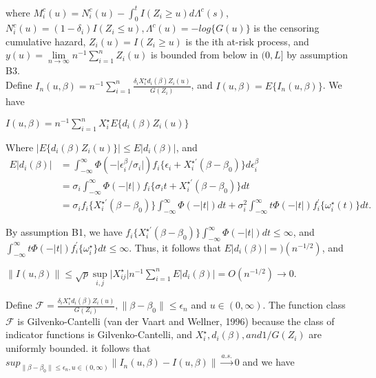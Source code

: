 \documentclass[12pt]{article}
\begin{document}
	\noindent where $M_i^c(u) = N_i^c(u)-\int_{0}^{t}I(Z_i\geq u)d\Lambda^c(s)$, $N_i^c(u)=(1-\delta_i)I(Z_i\leq u), \Lambda^c(u) = -log\{G(u)\}$ is the censoring cumulative hazard, $Z_i(u)=I(Z_i \geq u)$ is the ith at-risk process, and $y(u)=\lim\limits_{n \to \infty} n^{-1} \sum_{i=1}^{n} Z_i(u)$ is bounded from below in $(0,L]$ by assumption B3.\\
	
	\noindent Define $I_n(u,\beta)=n^{-1} \sum_{i=1}^{n}\frac{\delta_i X_i^\star d_i(\beta)Z_i(u)}{G(Z_i)}$, and $I(u,\beta)=E\{I_n(u,\beta)\}$. We have
	\begin{center}
		$I(u,\beta)=n^{-1} \sum_{i=1}^{n}X_i^\star E\{d_i(\beta)Z_i(u)\}$
	\end{center}
	Where $\lvert E\{d_i(\beta)Z_i(u)\} \rvert \leq E\lvert d_i(\beta) \rvert$, and
	\begin{align*}
	E\lvert d_i(\beta) \rvert & = \int_{-\infty}^{\infty} \Phi(-\lvert\epsilon_i^\beta/\sigma_i\rvert)f_i\{\epsilon_i+X_i^{\star \prime}(\beta-\beta_0)\}d\epsilon_i^\beta\\
	& = \sigma_i \int_{-\infty}^{\infty} \Phi(-\lvert t \rvert)f_i\{\sigma_i t+X_i^{\star \prime}(\beta-\beta_0)\}dt\\
	& = \sigma_i f_i\{X_i^{\star \prime}(\beta-\beta_0)\}\int_{-\infty}^{\infty} \Phi (- \lvert t \rvert)dt + \sigma_i^2 \int_{-\infty}^{\infty}t \Phi (- \lvert t \rvert) f_i^\prime \{\omega_i^\star(t) \}dt.
	\end{align*}
	
	\noindent By assumption B1, we have $f_i\{X_i^{\star \prime}(\beta-\beta_0) \}\int_{-\infty}^{\infty}\Phi(- \lvert t \rvert)dt \leq \infty$, and \mbox{$\int_{-\infty}^{\infty} t \Phi(- \lvert t \rvert)f_i^\prime\{\omega_i^{\star} \}dt\leq \infty$}. Thus, it follows that $E\lvert d_i(\beta) \rvert=)(n^{-1/2})$, and
	
	\begin{center}
		$\lVert I(u,\beta) \rVert \leq \sqrt{p} \sup\limits_{i,j} \lvert X_{ij}^{\star} \rvert n^{-1}\sum_{i=1}^{n} E \lvert d_i(\beta) \rvert = O(n^{-1/2}) \to 0$.
	\end{center}
	
	\noindent Define $\mathcal{F}=\frac{\delta_i X_i^\star d_i(\beta) Z_i(u)}{G(Z_i)}, \lVert \beta - \beta_0 \rVert \leq \epsilon_n$ and $u \in (0, \infty)$. The function class $\mathcal{F}$ is Gilvenko-Cantelli (van der Vaart and Wellner, 1996) because the class of indicator functions is Gilvenko-Cantelli, and $X_i^\star, d_i(\beta), and 1/G(Z_i)$ are uniformly bounded. it follows that $sup_{\lVert \beta - \beta_0 \rVert \leq \epsilon_n, u \in (0,\infty)} \lVert I_n(u,\beta)- I(u, \beta) \rVert \xrightarrow{a.s.} 0$ and we have
	
\end{document}
